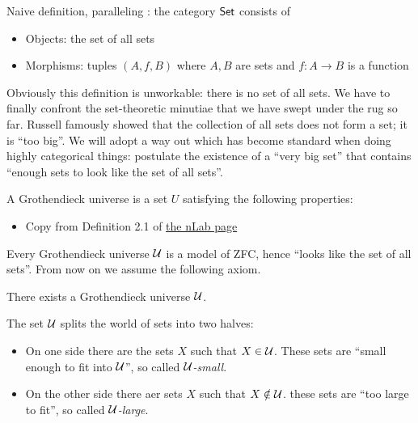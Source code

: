 Naive definition, paralleling : the category \(\mathsf{Set}\) consists of
\begin{itemize}
\item Objects: the set of all sets
\item Morphisms: tuples \((A,f,B)\) where \(A,B\) are sets and \(f : A \to B\) is a function
\end{itemize}
Obviously this definition is unworkable: there is no set of all sets.
We have to finally confront the set-theoretic minutiae that we have swept under the rug so far.
Russell famously showed that the collection of all sets does not form a set; it is ``too big''.
We will adopt a way out which has become standard when doing highly categorical things:
postulate the existence of a ``very big set'' that contains ``enough sets to look like the set of all sets''.
\begin{definition}
  A Grothendieck universe is a set \(U\) satisfying the following properties:
  \begin{itemize}
    \item Copy from Definition 2.1 of \href{https://ncatlab.org/nlab/show/Grothendieck+universe}{the nLab page}
  \end{itemize}
\end{definition}
Every Grothendieck universe \(\mathcal U\) is a model of ZFC, hence ``looks like the set of all sets''.
From now on we assume the following axiom.
\begin{axiom}
  There exists a Grothendieck universe \(\mathcal U\).
\end{axiom}
The set \(\mathcal U\) splits the world of sets into two halves:
\begin{itemize}
\item On one side there are the sets \(X\) such that \(X \in \mathcal U\). These sets are ``small enough to fit into \(\mathcal U\)'', so called \emph{\(\mathcal U\)-small}.
\item On the other side there aer sets \(X\) such that \(X \notin \mathcal U\). these sets are ``too large to fit'', so called \emph{\(\mathcal U\)-large}.
\end{itemize}

